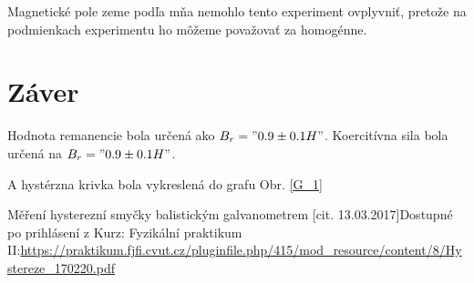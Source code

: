 \documentclass[10pt]{scrartcl}
\begin{document}
Magnetické pole zeme podľa mňa nemohlo tento experiment ovplyvniť, pretože na podmienkach experimentu ho môžeme považovať za homogénne.

\section{Záver}
Hodnota remanencie bola určená ako $B_r="0.9\pm0.1 H"$.
Koercitívna sila bola určená na $B_r="0.9\pm0.1 H"$.

A hystérzna krivka bola vykreslená do grafu Obr. \ref{G_1}


\begin{thebibliography}{2}
Měření hysterezní smyčky balistickým galvanometrem [cit. 13.03.2017]Dostupné po prihlásení z Kurz: Fyzikální praktikum II:\url{https://praktikum.fjfi.cvut.cz/pluginfile.php/415/mod_resource/content/8/Hystereze_170220.pdf}

\end{thebibliography}
\end{document}
